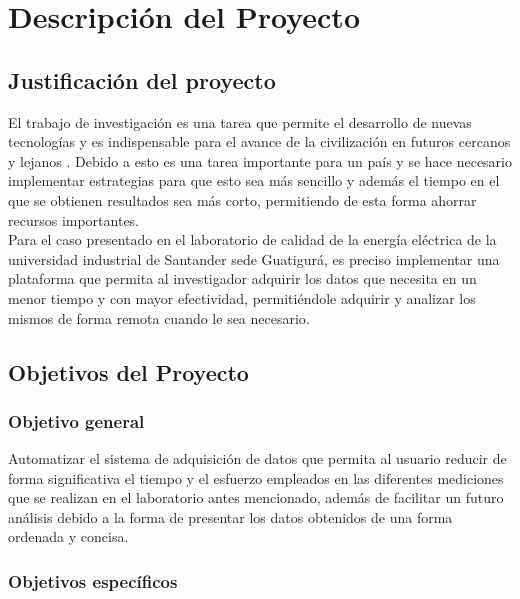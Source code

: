 
\chapter{Descripción del Proyecto}

\section{Justificación del proyecto}

El trabajo de investigación es una tarea que permite el desarrollo de nuevas tecnologías y es indispensable para el avance de la civilización en futuros cercanos y lejanos \cite{Noguera2016}.  %
Debido a esto es una tarea importante para un país y se hace necesario implementar estrategias para que esto sea más sencillo y además el tiempo en el que se obtienen resultados sea más corto, permitiendo de esta forma ahorrar recursos importantes. \\  

Para el caso presentado en el laboratorio de calidad de la energía eléctrica de la universidad industrial de Santander sede Guatigurá, es preciso implementar una plataforma que permita al investigador adquirir los datos que necesita en un menor tiempo y con mayor efectividad, permitiéndole adquirir y analizar los mismos de forma remota cuando le sea necesario.


\section{Objetivos del Proyecto}

\subsection{Objetivo general}

Automatizar el sistema de adquisición de datos que permita al usuario reducir de forma significativa el tiempo y el esfuerzo empleados en las diferentes mediciones que se realizan en el laboratorio antes mencionado, además de facilitar un futuro análisis debido a la forma de presentar los datos obtenidos de una forma ordenada y concisa. 

\subsection{Objetivos específicos}

